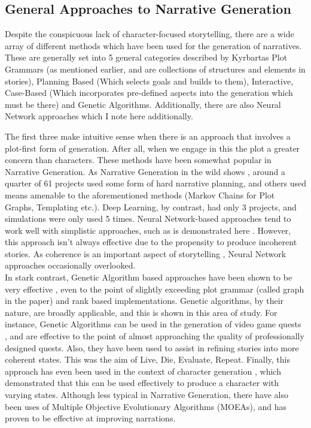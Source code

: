 \documentclass[11pt]{article}
\begin{document}
\subsection{General Approaches to Narrative Generation}
Despite the conspicuous lack of character-focused storytelling, there are a wide array of different methods which have been used for the generation of narratives. These are generally set into 5 general categories described by Kyrbartas\cite{KybartasGenerationTechniques} \: Plot Grammars (as mentioned earlier, and are collections of structures and elements in stories), Planning Based (Which selects goals and builds to them), Interactive, Case-Based (Which incorporates pre-defined aspects into the generation which must be there) and Genetic Algorithms. Additionally, there are also Neural Network approaches which I note here additionally. 

The first three make intuitive sense when there is an approach that involves a plot-first form of generation. After all, when we engage in this the plot a greater concern than characters. These methods have been somewhat popular in Narrative Generation. As Narrative Generation in the wild shows \cite{van-stegeren-theune-2019-narrative}, around a quarter of 61 projects used some form of hard narrative planning, and others used means amenable to the aforementioned methods (Markov Chains for Plot Graphs, Templating etc.). Deep Learning, by contrast, had only 3 projects, and simulations were only used 5 times. Neural Network-based approaches tend to work well with simplistic approaches, such as is demonstrated here \cite{NeuralNetworkOne}. However, this approach isn't always effective due to the propensity to produce incoherent stories. As coherence is an important aspect of storytelling \cite{sagarkar-etal-2018-quality}, Neural Network approaches occasionally overlooked. \\

In stark contrast, Genetic Algorithm based approaches have been shown to be very effective \cite{mcintyre-lapata-2010-plot}, even to the point of slightly exceeding plot grammar (called graph in the paper) and rank based implementations. Genetic algorithms, by their nature, are broadly applicable, and this is shown in this area of study. For instance, Genetic Algorithms can be used in the generation of video game quests \cite{questgeneration}, and are effective to the point of almost approaching the quality of professionally designed quests. Also, they have been used to assist in refining stories into more coherent states. This was the aim of Live, Die, Evaluate, Repeat\cite{Riegl2018LiveDE}. Finally, this approach has even been used in the context of character generation \cite{charactergeneration}, which demonstrated that this can be used effectively to produce a character with varying states. Although less typical in Narrative Generation, there have also been uses of Multiple Objective Evolutionary Algorithms (MOEAs)\cite{MOEANarrative}, and has proven to be effective at improving narrations.
\end{document}
